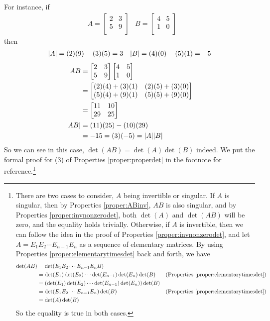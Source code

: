For instance, if
\begin{align*}
&A = 
\begin{bmatrix}
2 & 3 \\
5 & 9 \\
\end{bmatrix}
&B = 
\begin{bmatrix}
4 & 5 \\
1 & 0 \\
\end{bmatrix}
\end{align*}
then
\begin{align*}
&\abs{A} = (2)(9) - (3)(5) = 3 
&\abs{B} = (4)(0) - (5)(1) = -5
\end{align*}
\begin{align*}
AB &= 
\begin{bmatrix}
2 & 3 \\
5 & 9 \\
\end{bmatrix}
\begin{bmatrix}
4 & 5 \\
1 & 0 \\
\end{bmatrix} \\
&= 
\begin{bmatrix}
(2)(4)+(3)(1) & (2)(5)+(3)(0) \\
(5)(4)+(9)(1) & (5)(5)+(9)(0)
\end{bmatrix} \\
&= 
\begin{bmatrix}
11 & 10 \\
29 & 25
\end{bmatrix} \\
\abs{AB} &= (11)(25) - (10)(29) \\
&= -15 = (3)(-5) = \abs{A}\abs{B}
\end{align*}
So we can see in this case, $\det(AB) = \det(A)\det(B)$ indeed. We put the formal proof for (3) of Properties \ref{proper:properdet} in the footnote for reference.\footnote{There are two cases to consider, $A$ being invertible or singular. If $A$ is singular, then by Properties \ref{proper:ABinv}, $AB$ is also singular, and by Properties \ref{proper:invnonzerodet}, both $\det(A)$ and $\det(AB)$ will be zero, and the equality holds trivially. Otherwise, if $A$ is invertible, then we can follow the idea in the proof of Properties \ref{proper:invnonzerodet}, and let $A = E_{1}E_{2} \cdots E_{n-1}E_n$ as a sequence of elementary matrices. By using Properties \ref{proper:elementarytimesdet} back and forth, we have
\begin{align*}
\det(AB) &= \det(E_{1}E_{2} \cdots E_{n-1}E_nB) \\
&= \det(E_1) \det(E_{2}) \cdots \det(E_{n-1})\det(E_n)\det(B) & \text{(Properties \ref{proper:elementarytimesdet})} \\
&= (\det(E_1) \det(E_{2}) \cdots \det(E_{n-1})\det(E_n))\det(B) \\
&= \det(E_{1}E_{2} \cdots E_{n-1}E_n)\det(B) & \text{(Properties \ref{proper:elementarytimesdet})} \\
&= \det(A)\det(B)
\end{align*}
So the equality is true in both cases.}


